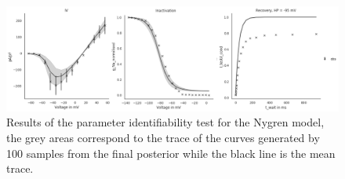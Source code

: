 \documentclass[11pt]{report}
\begin{document}
\begin{figure}[H]
    \centering
    \begin{measuredfigure}
\includegraphics[width = \textwidth ]{figures/Ina_Nygren_sch/ina_nygren_exp_iv_inact_recov_all_sch_pop_10000.png}
    \captionsetup{singlelinecheck = false, format= hang, justification=centerlast, labelsep=space}
	\caption{Results of the parameter identifiability test for the Nygren \cite{Nygren1998} model, the grey areas correspond to the trace of the curves generated by 100 samples from the final posterior while the black line is the mean trace.}
	\end{measuredfigure}
      \addtocounter{figure}{-1}
	\label{fig:InaParameterIdentifiabilityNygrenSch}
\end{figure}
\end{document}
